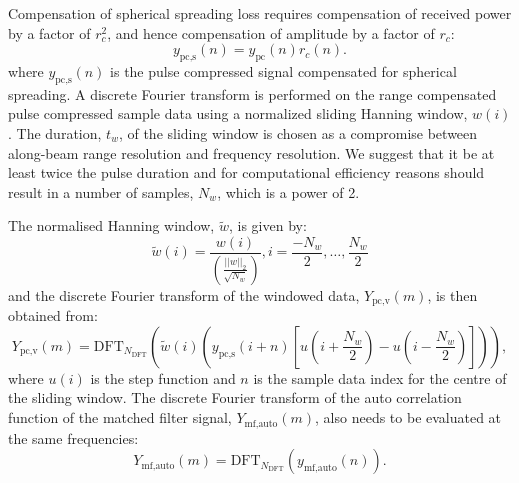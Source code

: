 \documentclass[preprint,12pt,TurnOnLineNumbers]{JASAnew}
\newcommand{\samplesymt}{n}
\newcommand{\samplesymf}{m}
\newcommand{\genidxsym}{i}
\newcommand{\ypc}{y_{\textrm{pc}}}
\newcommand{\ypcspread}{y_{\textrm{pc,s}}}
\newcommand{\ymfauto}{y_{\textrm{mf,auto}}}
\newcommand{\ypcvolumef}{Y_{\textrm{pc,v}}}
\newcommand{\ymfautof}{Y_{\textrm{mf,auto}}}
\newcommand{\hannw}{w}
\newcommand{\hannwnorm}{\tilde{\hannw}}
\newcommand{\nw}{N_{\hannw}}
\newcommand{\tslide}{t_w}
\newcommand{\range}{r}
\newcommand{\dft}{\textrm{DFT}}
\newcommand{\ndft}{{N_{\textrm{DFT}}}}
\begin{document}
Compensation of spherical spreading loss requires compensation of received power by a factor of $r_c^2$, and hence compensation of amplitude by a factor of $\range_c$:
%
\begin{equation}
\label{eq:spreadcomp}
\ypcspread(\samplesymt) = \ypc(\samplesymt)\range_c(\samplesymt).
\end{equation}
%
where $\ypcspread(\samplesymt)$ is the pulse compressed signal compensated for spherical spreading. A discrete Fourier transform is performed on the range compensated pulse compressed sample data using a normalized sliding Hanning window, $\hannw(\genidxsym)$. The duration, $\tslide$, of the sliding window is chosen as a compromise between along-beam range resolution and frequency resolution. We suggest that it be at least twice the pulse duration and for computational efficiency reasons should result in a number of samples, $\nw$, which is a power of 2.

The normalised Hanning window, $\hannwnorm$, is given by: 
%
\begin{equation}
\label{eq:hannw}
\hannwnorm(\genidxsym) = \frac{\hannw(\genidxsym)}{\left( \frac{||\hannw||_2}{\sqrt{\nw}} \right)}, i = \frac{-\nw}{2}, \ldots, \frac{\nw}{2}
\end{equation}
%
and the discrete Fourier transform of the windowed data, $\ypcvolumef(\samplesymf)$, is then obtained from:
%
\begin{equation}
\label{eq:FFT_volume}
\ypcvolumef(\samplesymf) = \dft_\ndft 
\left( \hannwnorm(\genidxsym) \left(\ypcspread (\genidxsym+\samplesymt) \left[ u(\genidxsym + \frac{\nw}{2}) - u(\genidxsym - \frac{\nw}{2}) \right] \right) \right),
\end{equation}
%
where $u(\genidxsym)$ is the step function and $\samplesymt$ is the sample data index for the centre of the sliding window. The discrete Fourier transform of the auto correlation function of the matched filter signal, $\ymfautof(\samplesymf)$, also needs to be evaluated at the same frequencies:
%
\begin{equation}
\label{eq:FFT_TX_Auto}
\ymfautof(\samplesymf)  =  \dft_\ndft (\ymfauto(\samplesymt)).
\end{equation}
\end{document}

